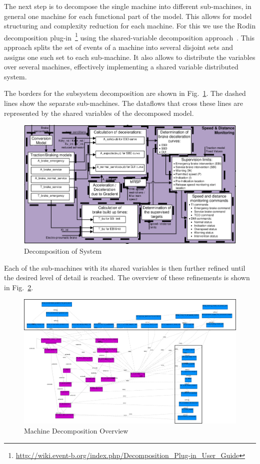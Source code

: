 \documentclass{template/openetcs_article}
\begin{document}
The next step is to decompose the single machine into different sub-machines, in
general one machine for each functional part of the model. This allows for model
structuring and complexity reduction for each machine. For this we use the Rodin
decomposition
plug-in~\footnote{\url{http://wiki.event-b.org/index.php/Decomposition_Plug-in_User_Guide}}
using the shared-variable decomposition
approach~\cite{silva2011decomposition}. This approach splits the set of events
of a machine into several disjoint sets and assigns one such set to each
sub-machine. It also allows to distribute the variables over several machines,
effectively implementing a shared variable distributed system.

The borders for the subsystem decomposition are shown in
Fig.~\ref{fig:system-decomposition}. The dashed lines show the separate
sub-machines. The dataflows that cross these lines are represented by the shared
variables of the decomposed model.

\begin{figure}[ht]
  \centering
  \includegraphics[width=.66\textwidth]{OverviewSelected}
  \caption{Decomposition of System}
  \label{fig:system-decomposition}
\end{figure}

Each of the sub-machines with its shared variables is then further refined until
the desired level of detail is reached. The overview of these refinements is
shown in Fig.~\ref{fig:machine-decompositon-overview}.

\begin{figure}[ht]
  \centering
  \includegraphics[width=\textwidth]{Section_3_13-layout}
  \caption{Machine Decomposition Overview}
  \label{fig:machine-decompositon-overview}
\end{figure}
\end{document}
